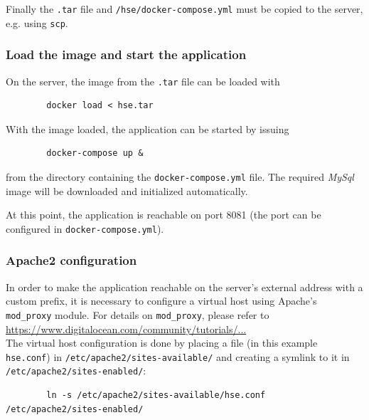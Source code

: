 \documentclass[a4paper]{usiinfbachelorproject}
\begin{document}
\begin{appendices}
        Finally the \texttt{.tar} file and \texttt{/hse/docker-compose.yml} must be copied to the server, e.g. using \texttt{scp}.

        \subsubsection{Load the image and start the application}

        On the server, the image from the \texttt{.tar} file can be loaded with

        \begin{verbatim}
        docker load < hse.tar
        \end{verbatim}

        With the image loaded, the application can be started by issuing

        \begin{verbatim}
        docker-compose up &
        \end{verbatim}

        from the directory containing the \texttt{docker-compose.yml} file. The required \emph{MySql} image will
        be downloaded and initialized automatically.

        At this point, the application is reachable on port 8081 (the port can be configured in \texttt{docker-compose.yml}).

        \subsubsection{Apache2 configuration}

        In order to make the application reachable on the server's external address with a custom prefix, it is necessary to
        configure a virtual host using Apache's \texttt{mod\_proxy} module. For details on \texttt{mod\_proxy}, please
        refer to \\ \href{https://www.digitalocean.com/community/tutorials/how-to-use-apache-http-server-as-reverse-proxy-using-mod_proxy-extension}{https://www.digitalocean.com/community/tutorials/...} \\

        The virtual host configuration is done by placing a file (in this example \texttt{hse.conf}) in \texttt{/etc/apache2/sites-available/} and creating
        a symlink to it in \texttt{/etc/apache2/sites-enabled/}:

        \begin{verbatim}
        ln -s /etc/apache2/sites-available/hse.conf /etc/apache2/sites-enabled/
        \end{verbatim}


\end{appendices}
\end{document}
